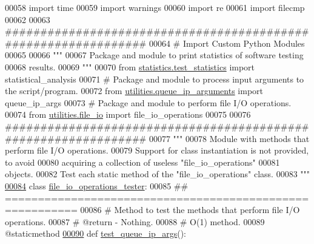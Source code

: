 \begin{DoxyCode}
00058 \textcolor{keyword}{import} time
00059 \textcolor{keyword}{import} warnings
00060 \textcolor{keyword}{import} re
00061 \textcolor{keyword}{import} filecmp
00062 
00063 \textcolor{comment}{###############################################################}
00064 \textcolor{comment}{#   Import Custom Python Modules}
00065 
00066 \textcolor{stringliteral}{"""}
00067 \textcolor{stringliteral}{    Package and module to print statistics of software testing}
00068 \textcolor{stringliteral}{        results.}
00069 \textcolor{stringliteral}{"""}
00070 \textcolor{keyword}{from} \hyperlink{namespacestatistics_1_1test__statistics}{statistics.test\_statistics} \textcolor{keyword}{import} statistical\_analysis
00071 \textcolor{comment}{# Package and module to process input arguments to the script/program.}
00072 \textcolor{keyword}{from} \hyperlink{namespaceutilities_1_1queue__ip__arguments}{utilities.queue\_ip\_arguments} \textcolor{keyword}{import} queue\_ip\_args
00073 \textcolor{comment}{# Package and module to perform file I/O operations.}
00074 \textcolor{keyword}{from} \hyperlink{namespaceutilities_1_1file__io}{utilities.file\_io} \textcolor{keyword}{import} file\_io\_operations
00075 
00076 \textcolor{comment}{###############################################################}
00077 \textcolor{stringliteral}{"""}
00078 \textcolor{stringliteral}{    Module with methods that perform file I/O operations.}
00079 \textcolor{stringliteral}{    Support for class instantiation is not provided, to avoid}
00080 \textcolor{stringliteral}{        acquiring a collection of useless "file\_io\_operations"}
00081 \textcolor{stringliteral}{        objects.}
00082 \textcolor{stringliteral}{    Test each static method of the "file\_io\_operations" class.}
00083 \textcolor{stringliteral}{"""}
\hypertarget{file__io__tester_8py_source_l00084}{}\hyperlink{classutilities_1_1file__io__tester_1_1file__io__operations__tester}{00084} \textcolor{keyword}{class }\hyperlink{classutilities_1_1file__io__tester_1_1file__io__operations__tester}{file\_io\_operations\_tester}:
00085     \textcolor{comment}{## =========================================================}
00086     \textcolor{comment}{#   Method to test the methods that perform file I/O operations.}
00087     \textcolor{comment}{#   @return - Nothing.}
00088     \textcolor{comment}{#   O(1) method.}
00089     @staticmethod
\hypertarget{file__io__tester_8py_source_l00090}{}\hyperlink{classutilities_1_1file__io__tester_1_1file__io__operations__tester_aeb92655105777047c5da87ac2fe33451}{00090}     \textcolor{keyword}{def }\hyperlink{classutilities_1_1file__io__tester_1_1file__io__operations__tester_aeb92655105777047c5da87ac2fe33451}{test\_queue\_ip\_args}():

\end{DoxyCode}
